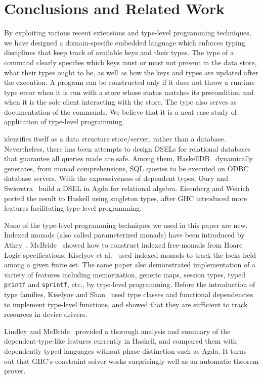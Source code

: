 
\section{Conclusions and Related Work}
\label{sec:conclusions}

By exploiting various recent extensions and type-level programming techniques,
we have designed a domain-specific embedded language \Edis{} which enforces
typing disciplines that keep track of available keys and their types. The
type of a command clearly specifies which keys must or must not present in
the data store, what their types ought to be, as well as how the keys and types are updated after the execution. A program can be constructed only if it does
not throw a runtime type error when it is run with a store whose status matches
its precondition and when it is the sole client interacting with the store.
The type also serves as documentation of the
commands. We believe that it is a neat case study of application of type-level programming.

\Redis{} identifies itself as a data structure store/server, rather than a
database. Nevertheless, there has been attempts to design DSELs for relational
databases that guarantee all queries made are safe. Among them, {\sc HaskellDB}~\cite{haskelldb,haskelldbimproved} dynamically generates, from monad comprehensions, SQL queries to be executed on ODBC database servers.
With the expressiveness of dependent types, Oury and Swierstra~\cite{pi}
build a DSEL in Agda for relational algebra. Eisenberg and
Weirich~\cite{singletons} ported the result to Haskell using singleton types, after GHC introduced more features facilitating type-level programming.

None of the type-level programming techniques we used in this paper are new.
Indexed monads (also called parameterized monads) have been introduced by
Atkey~\cite{indexedmonad}. McBride~\cite{kleisli} showed how to construct
indexed free-monads from Hoare Logic specifications. Kiselyov et
al.~\cite{typefun} used indexed monads to track the locks held among a given
finite set. The same paper also demonstrated implementation of a variety of
features including memorization, generic maps, session types, typed
\texttt{printf} and \texttt{sprintf}, etc., by type-level programming.
Before the introduction of type families, Kiselyov and
Shan~\cite{staticresources} used type classes and functional dependencies to
implement type-level functions, and showed that they are sufficient to track
resources in device drivers.

Lindley and McBride~\cite{phasedistinction} provided a thorough analysis and summary of the dependent-type-like features currently in Haskell, and
compared them with dependently typed languages without phase distinction such as Agda. It turns out that GHC's constraint solver works surprisingly well as an
automatic theorem prover.
